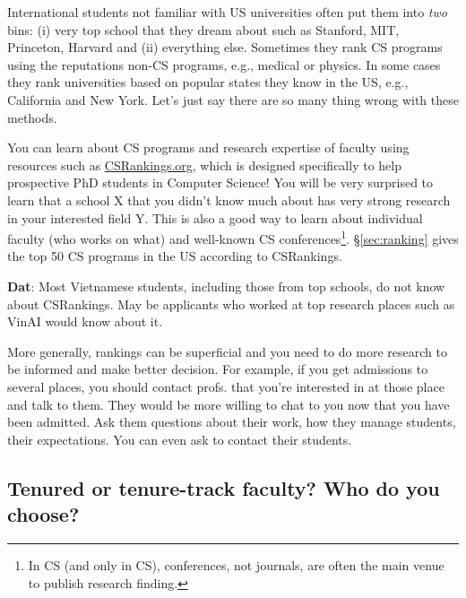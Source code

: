 \documentclass[11pt]{article}
\newenvironment{commentbox}[1][]{
\small
    \begin{cbox}
    \textbf{#1}: 
 }{
   \end{cbox}
}
\begin{document}
International students not familiar with US universities often put them into \emph{two} bins:  (i) very top school that they dream about such as Stanford, MIT, Princeton, Harvard and (ii) everything else.  Sometimes they rank CS programs using the reputations non-CS programs, e.g., medical or physics.
In some cases they rank universities based on popular states they know in the US, e.g., California and New York.  Let's just say there are so many thing wrong with these methods.

You can learn about CS programs and research expertise of faculty using resources such as \href{https://csrankings.org}{CSRankings.org}, which is designed specifically to help prospective PhD students in Computer Science!  You will be very surprised to learn that a school X that you didn't know much about has very strong research in your interested field Y. This is also a good way to learn about individual faculty (who works on what) and well-known CS conferences\footnote{In CS (and only in CS), conferences, not journals, are often the main venue to publish research finding.}. \S\ref{sec:ranking} gives the top 50 CS programs in the US according to CSRankings.
\begin{commentbox}[Dat] Most Vietnamese students, including those from top schools, do not know about CSRankings.  May be applicants who worked at top research places such as VinAI would know about it.
\end{commentbox}

More generally, rankings can be superficial and you need to do more research to be informed and make better decision. For example, if you get admissions to several places, you should contact profs. that you're interested in at those place and talk to them. They would be more willing to chat to you now that you have been admitted.  Ask them questions about their work, how they manage students, their expectations. You can even ask to contact their students.


\subsection{Tenured or tenure-track faculty? Who do you choose?}
\end{document}
